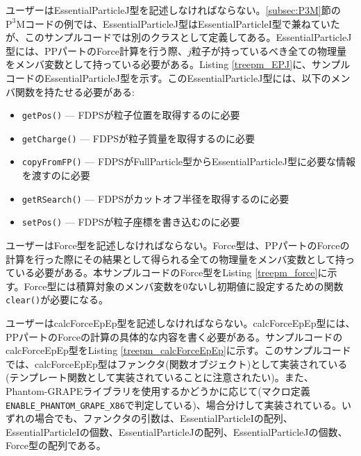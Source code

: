 

ユーザーはEssentialParticleJ型を記述しなければならない。\ref{subsec:P3M}節の$\mathrm{P^{3}M}$コードの例では、EssentialParticleJ型はEssentialParticleI型で兼ねていたが、このサンプルコードでは別のクラスとして定義してある。EssentialParticleJ型には、PPパートのForce計算を行う際、$j$粒子が持っているべき全ての物理量をメンバ変数として持っている必要がある。Listing \ref{treepm_EPJ}に、サンプルコードのEssentialParticleJ型を示す。このEssentialParticleJ型には、以下のメンバ関数を持たせる必要がある:
\begin{itemize}[leftmargin=*,itemsep=-1ex]
\item \texttt{getPos()} --- FDPSが粒子位置を取得するのに必要
\item \texttt{getCharge()} --- FDPSが粒子質量を取得するのに必要
\item \texttt{copyFromFP()} --- FDPSがFullParticle型からEssentialParticleJ型に必要な情報を渡すのに必要
\item \texttt{getRSearch()} --- FDPSがカットオフ半径を取得するのに必要
\item \texttt{setPos()} --- FDPSが粒子座標を書き込むのに必要
\end{itemize}



ユーザーはForce型を記述しなければならない。Force型は、PPパートのForceの計算を行った際にその結果として得られる全ての物理量をメンバ変数として持っている必要がある。本サンプルコードのForce型をListing \ref{treepm_force}に示す。Force型には積算対象のメンバ変数を0ないし初期値に設定するための関数\texttt{clear()}が必要になる。



ユーザーはcalcForceEpEp型を記述しなければならない。calcForceEpEp型には、PPパートのForceの計算の具体的な内容を書く必要がある。サンプルコードのcalcForceEpEp型をListing \ref{treepm_calcForceEpEp}に示す。このサンプルコードでは、calcForceEpEp型はファンクタ(関数オブジェクト)として実装されている(テンプレート関数として実装されていることに注意されたい)。また、Phantom-GRAPEライブラリを使用するかどうかに応じて(マクロ定義\texttt{ENABLE\_PHANTOM\_GRAPE\_X86}で判定している)、場合分けして実装されている。いずれの場合でも、ファンクタの引数は、EssentialParticleIの配列、EssentialParticleIの個数、EssentialParticleJの配列、EssentialParticleJの個数、Force型の配列である。

